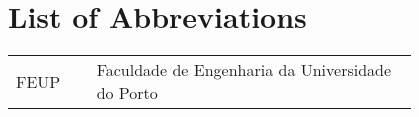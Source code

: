 \thispagestyle{empty}

\chapter*{List of Abbreviations}

\begin{flushleft}
	\begin{longtable}{l p{0.8\linewidth}}
		FEUP				& \hspace{5mm} Faculdade de Engenharia da Universidade do Porto\\[1mm]
	\end{longtable}
\end{flushleft}
